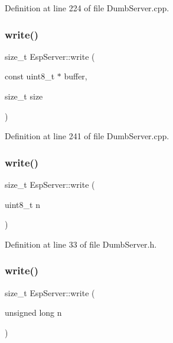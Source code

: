 Definition at line 224 of file Dumb\+Server.\+cpp.

\mbox{\label{class_esp_server_a0756c42343195dd1d1aa2f61c9b095bf}} 
\subsubsection{\texorpdfstring{write()}{write()}\hspace{0.1cm}{\footnotesize\ttfamily [1/6]}}
{\footnotesize\ttfamily size\+\_\+t Esp\+Server\+::write (\begin{DoxyParamCaption}\item[{const uint8\+\_\+t $\ast$}]{buffer,  }\item[{size\+\_\+t}]{size }\end{DoxyParamCaption})\hspace{0.3cm}{\ttfamily [virtual]}}



Definition at line 241 of file Dumb\+Server.\+cpp.

\mbox{\label{class_esp_server_aecc7262ee265fd78affe24f35e49e1bb}} 
\subsubsection{\texorpdfstring{write()}{write()}\hspace{0.1cm}{\footnotesize\ttfamily [2/6]}}
{\footnotesize\ttfamily size\+\_\+t Esp\+Server\+::write (\begin{DoxyParamCaption}\item[{uint8\+\_\+t}]{n }\end{DoxyParamCaption})\hspace{0.3cm}{\ttfamily [inline]}}



Definition at line 33 of file Dumb\+Server.\+h.

\mbox{\label{class_esp_server_ae3ba71ceb4df9357d8e258efe3e79f4d}} 
\subsubsection{\texorpdfstring{write()}{write()}\hspace{0.1cm}{\footnotesize\ttfamily [3/6]}}
{\footnotesize\ttfamily size\+\_\+t Esp\+Server\+::write (\begin{DoxyParamCaption}\item[{unsigned long}]{n }\end{DoxyParamCaption})\hspace{0.3cm}{\ttfamily [inline]}}



